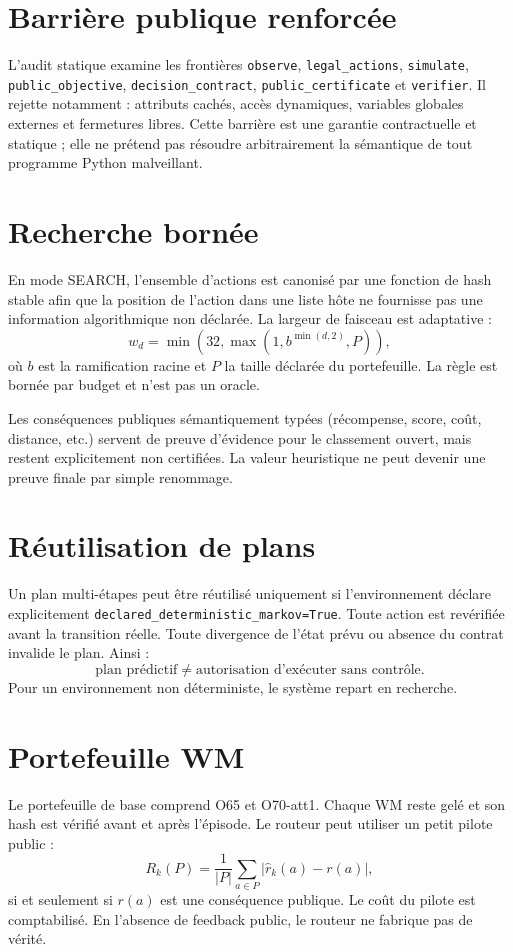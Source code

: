 \documentclass[11pt,a4paper]{article}
\begin{document}
\section{Barrière publique renforcée}
L'audit statique examine les frontières \texttt{observe}, \texttt{legal\_actions}, \texttt{simulate}, \texttt{public\_objective}, \texttt{decision\_contract}, \texttt{public\_certificate} et \texttt{verifier}. Il rejette notamment : attributs cachés, accès dynamiques, variables globales externes et fermetures libres. Cette barrière est une garantie contractuelle et statique ; elle ne prétend pas résoudre arbitrairement la sémantique de tout programme Python malveillant.
\section{Recherche bornée}
En mode SEARCH, l'ensemble d'actions est canonisé par une fonction de hash stable afin que la position de l'action dans une liste hôte ne fournisse pas une information algorithmique non déclarée. La largeur de faisceau est adaptative :
\[
w_d=\min\left(32,\max\left(1,b^{\min(d,2)},P\right)\right),
\]
où $b$ est la ramification racine et $P$ la taille déclarée du portefeuille. La règle est bornée par budget et n'est pas un oracle.

Les conséquences publiques sémantiquement typées (récompense, score, coût, distance, etc.) servent de preuve d'évidence pour le classement ouvert, mais restent explicitement non certifiées. La valeur heuristique ne peut devenir une preuve finale par simple renommage.
\section{Réutilisation de plans}
Un plan multi-étapes peut être réutilisé uniquement si l'environnement déclare explicitement \texttt{declared\_deterministic\_markov=True}. Toute action est revérifiée avant la transition réelle. Toute divergence de l'état prévu ou absence du contrat invalide le plan. Ainsi :
\[
\text{plan prédictif}\neq\text{autorisation d'exécuter sans contrôle}.
\]
Pour un environnement non déterministe, le système repart en recherche.
\section{Portefeuille WM}
Le portefeuille de base comprend O65 et O70-att1. Chaque WM reste gelé et son hash est vérifié avant et après l'épisode. Le routeur peut utiliser un petit pilote public :
\[
R_k(P)=\frac1{|P|}\sum_{a\in P}|\hat r_k(a)-r(a)|,
\]
si et seulement si $r(a)$ est une conséquence publique. Le coût du pilote est comptabilisé. En l'absence de feedback public, le routeur ne fabrique pas de vérité.
\end{document}
